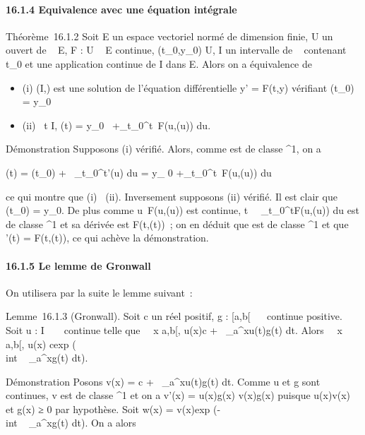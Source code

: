 \documentclass[]{article}
\begin{document}
\paragraph{16.1.4 Equivalence avec une équation intégrale}

Théorème~16.1.2 Soit E un espace vectoriel normé de dimension finie, U
un ouvert de ~ \times E, F : U \rightarrow~ E continue, (t\_0,y\_0) \in U,
I un intervalle de ~ contenant t\_0 et \phi une application
continue de I dans E. Alors on a équivalence de

\begin{itemize}
\itemsep1pt\parskip0pt
\item
  (i) (I,\phi) est une solution de l'équation différentielle y' = F(t,y)
  vérifiant \phi(t\_0) = y\_0
\item
  (ii) \forall~t \in I, \phi(t) = y\_0~
  +\int  \_t\_0^t~F(u,\phi(u))
  du.
\end{itemize}

Démonstration Supposons (i) vérifié. Alors, comme \phi est de classe
^1, on a

\phi(t) = \phi(t\_0) +\int ~
\_t\_0^t\phi'(u) du = y\_ 0
+\int  \_t\_0^t~F(u,\phi(u))
du

ce qui montre que (i) \rigtharrow~(ii). Inversement supposons (ii) vérifié. Il est
clair que \phi(t\_0) = y\_0. De plus comme
u\mapsto~F(u,\phi(u)) est continue,
t\mapsto~\int ~
\_t\_0^tF(u,\phi(u)) du est de classe ^1
et sa dérivée est F(t,\phi(t))~; on en déduit que \phi est de classe
^1 et que \phi'(t) = F(t,\phi(t)), ce qui achève la démonstration.

\paragraph{16.1.5 Le lemme de Gronwall}

On utilisera par la suite le lemme suivant~:

Lemme~16.1.3 (Gronwall). Soit c un réel positif, g : {[}a,b{[}\rightarrow~ ~
continue positive. Soit u : I \rightarrow~ ~ continue telle que
\forall~~x \in {[}a,b{[}, \textbar{}u(x)\textbar{}\leq c
+\int ~
\_a^x\textbar{}u(t)\textbar{}g(t) dt. Alors
\forall~~x \in {[}a,b{[}, \textbar{}u(x)\textbar{}\leq
cexp (\\int ~
\_a^xg(t) dt).

Démonstration Posons v(x) = c +\int ~
\_a^x\textbar{}u(t)\textbar{}g(t) dt. Comme u et g sont
continues, v est de classe ^1 et on a v'(x) =
\textbar{}u(x)\textbar{}g(x) \leq v(x)g(x) puisque
\textbar{}u(x)\textbar{}\leq v(x) et g(x) ≥ 0 par hypothèse. Soit w(x) =
v(x)exp (-\\int ~
\_a^xg(t) dt). On a alors
\end{document}
